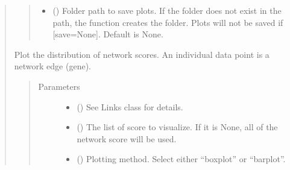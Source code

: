 \documentclass[letterpaper,10pt,english]{sphinxmanual}
\begin{document}
\begin{quote}
\begin{fulllineitems}
\begin{fulllineitems}
\begin{quote}
\begin{description}
\begin{itemize}
\item {} 
 () \textendash{} Folder path to save plots. If the folder does not exist in the path, the function creates the folder.
Plots will not be saved if {[}save=None{]}. Default is None.

\end{itemize}

\end{description}\end{quote}

\end{fulllineitems}


\begin{fulllineitems}
\label{\detokenize{modules/celloracle.network_analysis:celloracle.network_analysis.Links.plot_score_discributions}}
Plot the distribution of network scores.
An individual data point is a network edge (gene).
\begin{quote}\begin{description}
\item[{Parameters}] \leavevmode\begin{itemize}
\item {} 
 ({\hyperref[\detokenize{modules/celloracle:celloracle.Links}]{}}) \textendash{} See Links class for details.

\item {} 
 () \textendash{} The list of score to visualize. If it is None, all of the network score will be used.

\item {} 
 () \textendash{} Plotting method. Select either “boxplot” or “barplot”.


\end{itemize}
\end{description}
\end{quote}
\end{fulllineitems}
\end{fulllineitems}
\end{quote}
\end{document}
